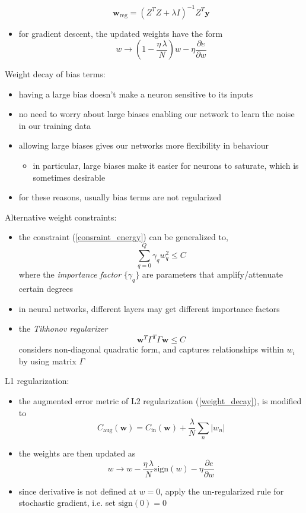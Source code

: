 \documentclass[onecolumn]{IEEEtran}
\newcommand{\beq}{\begin{equation}}
\newcommand{\eeq}{\end{equation}}
\newcommand{\bi}{\begin{itemize}}
\newcommand{\ei}{\end{itemize}}
\begin{document}
\begin{itemize}
        \beq\label{w_reg}
            \bm{w}_\text{reg} =  (Z^T Z + \lambda I)^{-1}Z^T\bm{y}
        \eeq
        \item for gradient descent, the updated weights have the form
        \beq\label{l2_update}
            w \rightarrow \left(1 - \frac{\eta \, \lambda}{N} \right)w - \eta \frac{\partial e}{\partial w}
        \eeq
    \ei
    \item Weight decay of bias terms:
    \bi
        \item having a large bias doesn't make a neuron sensitive to its inputs
        \item no need to worry about large biases enabling our network to learn the noise in our training data
        \item allowing large biases gives our networks more flexibility in behaviour
        \bi
            \item in particular, large biases make it easier for neurons to saturate, which is sometimes desirable
        \ei
        \item for these reasons, usually bias terms are not regularized
    \ei
    \item Alternative weight constraints:
    \bi
        \item the constraint (\ref{consraint_energy}) can be generalized to,
        \beq
            \sum_{q=0}^{Q} \gamma_q w_q^2 \leq C
        \eeq
        where the \emph{importance factor} $\{\gamma_q\}$ are parameters that amplify/attenuate certain degrees
        \item in neural networks, different layers may get different importance factors
        \item the \emph{Tikhonov regularizer}
        \beq
            \bm{w}^T\Gamma^T \Gamma \bm{w} \leq C
        \eeq
        considers non-diagonal quadratic form, and captures relationships within $w_i$ by using matrix $\Gamma$
    \ei
    \item L1 regularization:
    \bi
         \item the augmented error metric of L2 regularization (\ref{weight_decay}), is modified to
        \beq\label{l1_ref}
            C_\text{aug}(\bm{w}) = C_\text{in}(\bm{w}) + \frac{\lambda}{N} \sum_n |w_n|
        \eeq
        \item the weights are then updated as
        \beq
            w \rightarrow w - \frac{\eta \, \lambda}{N} \text{sign}(w) - \eta \frac{\partial e}{\partial w}
        \eeq
        \item since derivative is not defined at $w=0$, apply the un-regularized rule for stochastic gradient, i.e. set $\text{sign}(0)=0$

\end{itemize}
\end{document}
